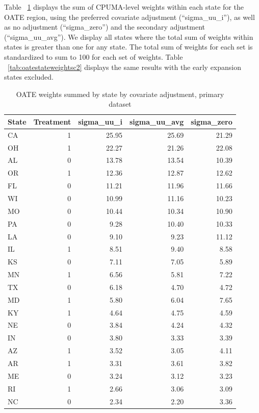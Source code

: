 Table ~\ref{tab:oatestateweightsc1} displays the sum of CPUMA-level weights within each state for the OATE region, using the preferred covariate adjustment (``sigma\_uu\_i''), as well as no adjustment (``sigma\_zero'') and the secondary adjustment (``sigma\_uu\_avg''). We display all states where the total sum of weights within states is greater than one for any state. The total sum of weights for each set is standardized to sum to 100 for each set of weights. Table ~\ref{tab:oatestateweightsc2} displays the same results with the early expansion states excluded.

\begin{table}[ht]
\centering
\caption{OATE weights summed by state by covariate adjustment, primary dataset}
\label{tab:oatestateweightsc1}
\begin{tabular}{lrrrr}
  \hline
State & Treatment & sigma\_uu\_i & sigma\_uu\_avg & sigma\_zero \\ 
  \hline
CA & 1 & 25.95 & 25.69 & 21.29 \\ 
  OH & 1 & 22.27 & 21.26 & 22.08 \\ 
  AL & 0 & 13.78 & 13.54 & 10.39 \\ 
  OR & 1 & 12.36 & 12.87 & 12.62 \\ 
  FL & 0 & 11.21 & 11.96 & 11.66 \\ 
  WI & 0 & 10.99 & 11.16 & 10.23 \\ 
  MO & 0 & 10.44 & 10.34 & 10.90 \\ 
  PA & 0 & 9.28 & 10.40 & 10.33 \\ 
  LA & 0 & 9.10 & 9.23 & 11.12 \\ 
  IL & 1 & 8.51 & 9.40 & 8.58 \\ 
  KS & 0 & 7.11 & 7.05 & 5.89 \\ 
  MN & 1 & 6.56 & 5.81 & 7.22 \\ 
  TX & 0 & 6.18 & 4.70 & 4.72 \\ 
  MD & 1 & 5.80 & 6.04 & 7.65 \\ 
  KY & 1 & 4.64 & 4.75 & 4.59 \\ 
  NE & 0 & 3.84 & 4.24 & 4.32 \\ 
  IN & 0 & 3.80 & 3.33 & 3.39 \\ 
  AZ & 1 & 3.52 & 3.05 & 4.11 \\ 
  AR & 1 & 3.31 & 3.61 & 3.82 \\ 
  ME & 0 & 3.24 & 3.12 & 3.23 \\ 
  RI & 1 & 2.66 & 3.06 & 3.09 \\ 
  NC & 0 & 2.34 & 2.20 & 3.36 \\ 

\end{tabular}
\end{table}
